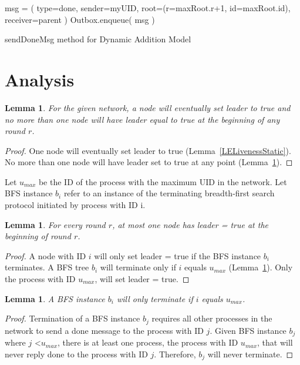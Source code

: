 \documentclass[english]{article}
\newtheorem{lemma}[theorem]{Lemma}
\begin{document}
\begin{algorithm}
  msg = ( type=done, sender=myUID, root=(r=maxRoot.r+1, id=maxRoot.id), receiver=parent ) \;
  Outbox.enqueue( msg ) \;
  \caption{sendDoneMsg method for Dynamic Addition Model}
\end{algorithm}

\section{Analysis}



\begin{lemma}
\label{LeaderElectionStatic}
For the given network, a node will eventually set leader to true and no more than one node will have leader equal to true at the beginning of any round $r$. 
\end{lemma}
\begin{proof}
One node will eventually set leader to true (Lemma~\ref{LELivenessStatic}).
No more than one node will have leader set to true at any point (Lemma~\ref{LESafetyStatic}).
\end{proof}

\begin{definition}
Let $u_{max}$ be the ID of the process with the maximum UID in the network. 
Let BFS instance $b_i$ refer to an instance of the terminating breadth-first search protocol initiated by process with ID i.
\end{definition}

\begin{lemma}
\label{LESafetyStatic}
For every round $r$, at most one node has leader = true at the beginning of round $r$.
\end{lemma}
\begin{proof}

A node with ID $i$ will only set leader = true if the BFS instance $b_i$ terminates.
A BFS tree $b_i$ will terminate only if $i$ equals $u_{max}$ (Lemma~\ref{BFSTermination}).
Only the process with ID $u_{max}$, will set leader = true. 

\end{proof}

\begin{lemma}
\label{BFSTermination}
  A BFS instance $b_i$ will only terminate if $i$ equals $u_{max}$.
\end{lemma}

\begin{proof}
  Termination of a BFS instance $b_j$ requires all other processes in the network to send a done message to the process with ID $j$.
Given BFS instance $b_j$ where $j$ \textless $u_{max}$, there is at least one process, the process with ID $u_{max}$, that will never reply done to the process with ID $j$. 
Therefore, $b_j$ will never terminate.
\end{proof}
\end{document}
